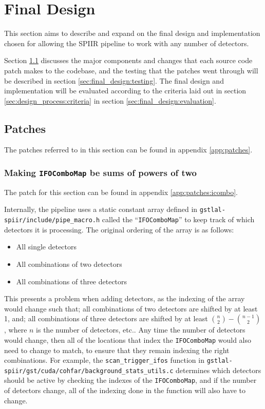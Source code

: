 \documentclass{article}
\begin{document}
\section{Final Design} \label{sec:final_design}

This section aims to describe and expand on the final design and implementation chosen for allowing the SPIIR pipeline to work with any number of detectors.

Section \ref{sec:final_design:patches} discusses the major components and changes that each source code patch makes to the codebase, and the testing that the patches went through will be described in section \ref{sec:final_design:testing}.
The final design and implementation will be evaluated according to the criteria laid out in section \ref{sec:design_process:criteria} in section \ref{sec:final_design:evaluation}.

\subsection{Patches} \label{sec:final_design:patches}

The patches referred to in this section can be found in appendix \ref{app:patches}.

\subsubsection{Making \texttt{IFOComboMap} be sums of powers of two} \label{sec:final_design:patches:ifocombo}

The patch for this section can be found in appendix \ref{app:patches:icombo}.

Internally, the pipeline uses a static constant array defined in \texttt{gstlal-spiir/include/pipe\_macro.h} called the ``\texttt{IFOComboMap}'' to keep track of which detectors it is processing.
The original ordering of the array is as follows:
\begin{itemize}
    \item All single detectors
    \item All combinations of two detectors
    \item All combinations of three detectors
\end{itemize}

This presents a problem when adding detectors, as the indexing of the array would change such that; all combinations of two detectors are shifted by at least 1, and; all combinations of three detectors are shifted by at least \(\binom{n}{2}-\binom{n-1}{2}\), where \(n\) is the number of detectors, etc..
Any time the number of detectors would change, then all of the locations that index the \texttt{IFOComboMap} would also need to change to match, to ensure that they remain indexing the right combinations.
For example, the \texttt{scan\_trigger\_ifos} function in \texttt{gstlal-spiir/gst/cuda/cohfar/background\_stats\_utils.c} determines which detectors should be active by checking the indexes of the \texttt{IFOComboMap}, and if the number of detectors change, all of the indexing done in the function will also have to change.
\end{document}
